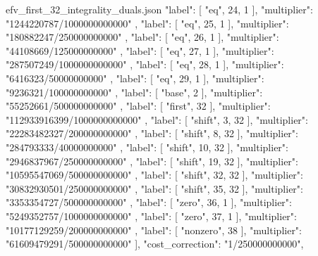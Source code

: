\documentclass[12pt,a4paper]{article}
\numberwithin{equation}{section}
\theoremstyle{definition}
\begin{document}
\begin{filecontents*}[overwrite]{efv_first_32_integrality_duals.json}
        {
          "label": [
            "eq",
            24,
            1
          ],
          "multiplier": "1244220787/1000000000000"
        },
        {
          "label": [
            "eq",
            25,
            1
          ],
          "multiplier": "180882247/250000000000"
        },
        {
          "label": [
            "eq",
            26,
            1
          ],
          "multiplier": "44108669/125000000000"
        },
        {
          "label": [
            "eq",
            27,
            1
          ],
          "multiplier": "287507249/1000000000000"
        },
        {
          "label": [
            "eq",
            28,
            1
          ],
          "multiplier": "6416323/50000000000"
        },
        {
          "label": [
            "eq",
            29,
            1
          ],
          "multiplier": "9236321/100000000000"
        },
        {
          "label": [
            "base",
            2
          ],
          "multiplier": "55252661/500000000000"
        },
        {
          "label": [
            "first",
            32
          ],
          "multiplier": "112933916399/1000000000000"
        },
        {
          "label": [
            "shift",
            3,
            32
          ],
          "multiplier": "22283482327/200000000000"
        },
        {
          "label": [
            "shift",
            8,
            32
          ],
          "multiplier": "284793333/40000000000"
        },
        {
          "label": [
            "shift",
            10,
            32
          ],
          "multiplier": "2946837967/250000000000"
        },
        {
          "label": [
            "shift",
            19,
            32
          ],
          "multiplier": "10595547069/500000000000"
        },
        {
          "label": [
            "shift",
            32,
            32
          ],
          "multiplier": "30832930501/250000000000"
        },
        {
          "label": [
            "shift",
            35,
            32
          ],
          "multiplier": "3353354727/500000000000"
        },
        {
          "label": [
            "zero",
            36,
            1
          ],
          "multiplier": "5249352757/1000000000000"
        },
        {
          "label": [
            "zero",
            37,
            1
          ],
          "multiplier": "10177129259/200000000000"
        },
        {
          "label": [
            "nonzero",
            38
          ],
          "multiplier": "61609479291/500000000000"
        }
      ],
      "cost_correction": "1/250000000000",

\end{filecontents*}
\end{document}
